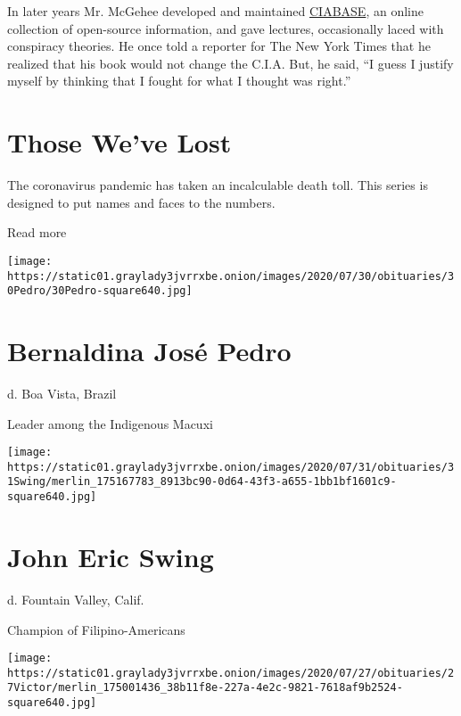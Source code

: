 In later years Mr. McGehee developed and maintained
\href{https://archive.org/details/CIABASE-Ralph_McGehee}{CIABASE}, an
online collection of open-source information, and gave lectures,
occasionally laced with conspiracy theories. He once told a reporter for
The New York Times that he realized that his book would not change the
C.I.A. But, he said, ``I guess I justify myself by thinking that I
fought for what I thought was right.''

\href{https://www.nytimes3xbfgragh.onion/interactive/2020/obituaries/people-died-coronavirus-obituaries.html?action=click\&pgtype=Article\&state=default\&region=BELOW_MAIN_CONTENT\&context=covid_obits_promo}{}

\hypertarget{those-weve-lost}{%
\section{Those We've Lost}\label{those-weve-lost}}

The coronavirus pandemic has taken an incalculable death toll. This
series is designed to put names and faces to the numbers.

Read more

\texttt{[image: https://static01.graylady3jvrrxbe.onion/images/2020/07/30/obituaries/30Pedro/30Pedro-square640.jpg]}

\hypertarget{bernaldina-josuxe9-pedro}{%
\section{Bernaldina José Pedro}\label{bernaldina-josuxe9-pedro}}

d. Boa Vista, Brazil

Leader among the Indigenous Macuxi

\texttt{[image: https://static01.graylady3jvrrxbe.onion/images/2020/07/31/obituaries/31Swing/merlin\_175167783\_8913bc90-0d64-43f3-a655-1bb1bf1601c9-square640.jpg]}

\hypertarget{john-eric-swing}{%
\section{John Eric Swing}\label{john-eric-swing}}

d. Fountain Valley, Calif.

Champion of Filipino-Americans

\texttt{[image: https://static01.graylady3jvrrxbe.onion/images/2020/07/27/obituaries/27Victor/merlin\_175001436\_38b11f8e-227a-4e2c-9821-7618af9b2524-square640.jpg]}

